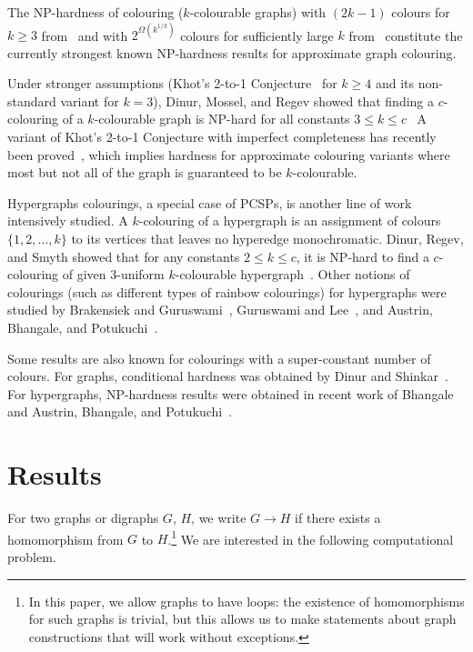 \documentclass[11pt,a4paper]{scrartcl}
\numberwithin{theorem}{section}
\theoremstyle{definition}
\begin{document}
The NP-hardness of colouring ($k$-colourable graphs) with $(2k-1)$ colours for
$k\geq 3$ from~\cite{BulinKO18} and with $2^{\Omega(k^{1/3})}$ colours for sufficiently
large $k$ from~\cite{Huang13} constitute the currently strongest known
NP-hardness results for approximate graph colouring.

Under stronger assumptions (Khot's 2-to-1 Conjecture~\cite{Khot02stoc} for
$k\geq 4$ and its non-standard variant for $k=3$), Dinur, Mossel, and Regev
showed that finding a $c$-colouring of a $k$-colourable graph is NP-hard for
all constants $3\leq k\leq c$~\cite{Dinur09:sicomp}
A variant of Khot's 2-to-1 Conjecture with imperfect completeness has recently been proved~\cite{DinurKKMS18,KhotMS18},
which implies hardness for approximate colouring variants where most but not all of the graph is guaranteed to be $k$-colourable.

Hypergraphs colourings, a special case of PCSPs, is another line of work
intensively studied. A $k$-colouring of a hypergraph is an assignment of colours
$\{1,2,\ldots,k\}$ to its vertices that leaves no hyperedge monochromatic. Dinur,
Regev, and Smyth showed that for any constants $2\leq  k\leq c$, it is NP-hard
to find a $c$-colouring of given $3$-uniform $k$-colourable
hypergraph~\cite{Dinur05:combinatorica}. Other notions of colourings (such as
different types of rainbow colourings) for
hypergraphs were studied by  Brakensiek and
Guruswami~\cite{Brakensiek16:ccc,Brakensiek17:approx}, Guruswami and
Lee~\cite{Guruswami18:combinatorica}, and Austrin, Bhangale, and
Potukuchi~\cite{Austrin18:arxiv}.

Some results are also known for colourings with a super-constant number of colours.
For graphs, conditional hardness was obtained by Dinur and
Shinkar~\cite{Dinur10:approx}. For hypergraphs, NP-hardness results were obtained
in recent work of Bhangale~\cite{Bhangale18:icalp} and Austrin, Bhangale, and
Potukuchi~\cite{Austrin19:arxiv}.

\section{Results}

For two graphs or digraphs $G$, $H$, we write $G \to H$ if there exists a
homomorphism from $G$ to $H$.\footnote{In this paper, we allow graphs to have
loops: the existence of homomorphisms for such graphs is trivial, but this
allows us to make statements about graph constructions that will work without
exceptions.} We are interested in the following computational problem.
\end{document}
